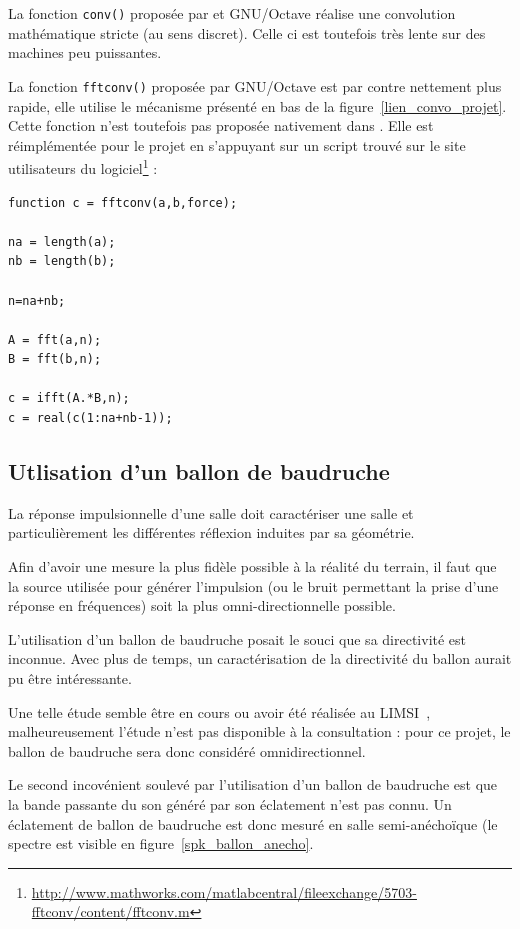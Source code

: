 La fonction \texttt{conv()} proposée par \matlab et GNU/Octave réalise une convolution mathématique stricte (au sens
discret). Celle ci est toutefois très lente sur des machines peu puissantes.

La fonction \texttt{fftconv()} proposée par GNU/Octave est par contre nettement plus rapide, elle utilise le mécanisme
présenté en bas de la figure~\ref{lien_convo_projet}. Cette fonction n'est toutefois pas proposée nativement dans
\matlab. Elle est réimplémentée pour le projet en s'appuyant sur un script trouvé sur le site utilisateurs du
logiciel\footnote{\url{http://www.mathworks.com/matlabcentral/fileexchange/5703-fftconv/content/fftconv.m}} :

\begin{Verbatim}[samepage=true]
function c = fftconv(a,b,force);

na = length(a);
nb = length(b);

n=na+nb;

A = fft(a,n);
B = fft(b,n);

c = ifft(A.*B,n);
c = real(c(1:na+nb-1));
\end{Verbatim}

\subsection{Utlisation d'un ballon de baudruche} %

La réponse impulsionnelle d'une salle doit caractériser une salle et particulièrement les différentes réflexion induites
par sa géométrie.

Afin d'avoir une mesure la plus fidèle possible à la réalité du terrain, il faut que la source utilisée pour générer
l'impulsion (ou le bruit permettant la prise d'une réponse en fréquences) soit la plus omni-directionnelle possible.

L'utilisation d'un ballon de baudruche posait le souci que sa directivité est inconnue. Avec plus de temps, un
caractérisation de la directivité du ballon aurait pu être intéressante.

Une telle étude semble être en cours ou avoir été réalisée au LIMSI~\cite{Bru10}, malheureusement l'étude n'est pas
disponible à la consultation : pour ce projet, le ballon de baudruche sera donc considéré omnidirectionnel.

Le second incovénient soulevé par l'utilisation d'un ballon de baudruche est que la bande passante du son généré par
son éclatement n'est pas connu. Un éclatement de ballon de baudruche est donc mesuré en salle semi-anéchoïque (le
spectre est visible en figure~\ref{spk_ballon_anecho}.

